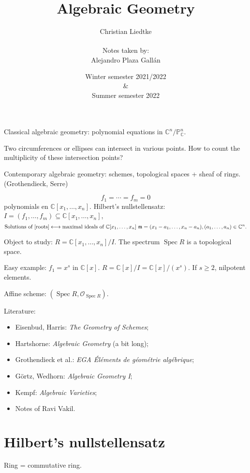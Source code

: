 \documentclass[12pt]{article}
\title{Algebraic Geometry}
\author{Christian Liedtke\\\\Notes taken by:\\Alejandro Plaza Gall\'an}
\date{Winter semester 2021/2022\\\&\\ Summer semester 2022}
\DeclareMathOperator{\Spec}{Spec}
\theoremstyle{definition}
\begin{document}
\maketitle
\tableofcontents
\newpage

Classical algebraic geometry: polynomial equations in $\mathbb C^n/\mathbb P_\mathbb C^n$.

Two circumferences or ellipses can intersect in various points. How to count the multiplicity of these intersection points?

Contemporary algebraic geometry: schemes, topological spaces + sheaf of rings. (Grothendieck, Serre)

\begin{equation}\tag{$*$}\label{roots}
f_1=\cdots=f_m=0
\end{equation}
polynomials en $\mathbb C[x_1,\ldots,x_n]$. Hilbert's nullstellensatz: $I=(f_1,\ldots,f_m)\subseteq\mathbb C[x_1,\ldots,x_n]$,
\[\text{Solutions of \eqref{roots}}\longleftrightarrow\text{maximal ideals of }\mathbb C[x_1,\ldots,x_n]\ \mathfrak m=(x_1-a_1,\ldots,x_n-a_n),(a_1,\ldots,a_n)\in\mathbb C^n.\]

Object to study: $R=\mathbb C[x_1,\ldots,x_n]/I$. The spectrum $\Spec R$ is a topological space.

Easy example: $f_1=x^s$ in $\mathbb C[x]$. $R=\mathbb C[x]/I=\mathbb C[x]/(x^s)$. If $s\geq2$, nilpotent elements.

Affine scheme: $(\Spec R,\mathcal O_{\Spec R})$.

Literature:
\begin{itemize}
\item[\cite{eisenbud2006geometry}] Eisenbud, Harris: \emph{The Geometry of Schemes};
\item[\cite{hartshorne2013algebraic}] Hartshorne: \emph{Algebraic Geometry} (a bit long);
\item[\cite{dieudonne1971elements}] Grothendieck et al.: \emph{EGA \'El\'ements de g\'eom\'etrie alg\'ebrique};
\item[\cite{gortz2010algebraic}] G\"ortz, Wedhorn: \emph{Algebraic Geometry I};
\item[\cite{kempf1993algebraic}] Kempf: \emph{Algebraic Varieties};
\item[\cite{vakil2006foundations}] Notes of Ravi Vakil.
\end{itemize}

\section{Hilbert's nullstellensatz}
Ring = commutative ring.
\end{document}
